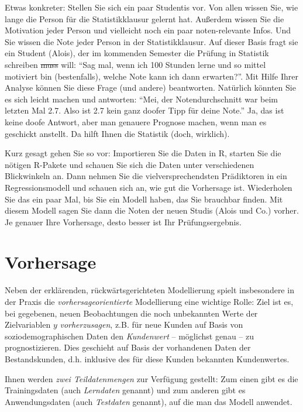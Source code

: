 \documentclass[
]{book}
\begin{document}
Etwas konkreter: Stellen Sie sich ein paar Studentis vor.
Von allen wissen Sie, wie lange die Person für die Statistikklausur gelernt hat.
Außerdem wissen Sie die Motivation jeder Person und vielleicht noch ein paar noten-relevante Infos.
Und Sie wissen die Note jeder Person in der Statistikklausur.
Auf dieser Basis fragt sie ein Student (Alois), der im kommenden Semester die Prüfung in Statistik schreiben \sout{muss} will:
``Sag mal, wenn ich 100 Stunden lerne und so mittel motiviert bin (bestenfalls), welche Note kann ich dann erwarten?''.
Mit Hilfe Ihrer Analyse können Sie diese Frage (und andere) beantworten.
Natürlich könnten Sie es sich leicht machen und antworten:
``Mei, der Notendurchschnitt war beim letzten Mal 2.7.
Also ist 2.7 kein ganz doofer Tipp für deine Note.''
Ja, das ist keine doofe Antwort, aber man genauere Prognose machen,
wenn man es geschickt anstellt.
Da hilft Ihnen die Statistik (doch, wirklich).

Kurz gesagt gehen Sie so vor:
Importieren Sie die Daten in R, starten Sie die nötigen R-Pakete und
schauen Sie sich die Daten unter verschiedenen Blickwinkeln an.
Dann nehmen Sie die vielversprechendsten Prädiktoren in ein Regressionsmodell und schauen sich an,
wie gut die Vorhersage ist.
Wiederholen Sie das ein paar Mal, bis Sie ein Modell haben, das Sie brauchbar finden.
Mit diesem Modell sagen Sie dann die Noten der neuen Studis (Alois und Co.) vorher.
Je genauer Ihre Vorhersage, desto besser ist Ihr Prüfungsergebnis.

\hypertarget{vorhersage}{%
\section{Vorhersage}\label{vorhersage}}

Neben der erklärenden, rückwärtsgerichteten Modellierung spielt insbesondere in der Praxis die \emph{vorhersageorientierte} Modellierung eine wichtige Rolle:
Ziel ist es, bei gegebenen, neuen Beobachtungen die noch unbekannten Werte der Zielvariablen \(y\) \emph{vorherzusagen}, z.B. für neue Kunden auf Basis von soziodemographischen Daten den \emph{Kundenwert} -- möglichst genau -- zu prognostizieren.
Dies geschieht auf Basis der vorhandenen Daten der Bestandskunden,
d.h. inklusive des für diese Kunden bekannten Kundenwertes.

Ihnen werden \emph{zwei Teildatenmengen} zur Verfügung gestellt:
Zum einen gibt es die Trainingsdaten (auch \emph{Lerndaten} genannt) und zum anderen gibt es Anwendungsdaten (auch \emph{Testdaten} genannt), auf die man das Modell anwendet.
\end{document}

